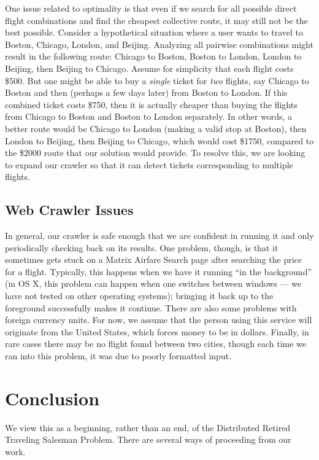 \documentclass{article}
\begin{document}
One issue related to optimality is that even if we search for all possible direct flight combinations and find the cheapest collective route, it may
still not be the best possible. Consider a hypothetical situation where a user wants to travel to Boston, Chicago, London, and Beijing.  Analyzing all
pairwise combinations might result in the following route: Chicago to Boston, Boston to London, London to Beijing, then Beijing to Chicago.  Assume
for simplicity that each flight costs \$500. But one might be able to buy a \emph{single} ticket for \emph{two} flights, say Chicago to Boston and
then (perhaps a few days later) from Boston to London. If this combined ticket costs \$750, then it is actually cheaper than buying the flights from
Chicago to Boston and Boston to London separately. In other words, a better route would be Chicago to London (making a valid stop at Boston), then
London to Beijing, then Beijing to Chicago, which would cost \$1750, compared to the \$2000 route that our solution would provide. To resolve this, we
are looking to expand our crawler so that it can detect tickets corresponding to multiple flights.

\subsection{Web Crawler Issues}

In general, our crawler is safe enough that we are confident in running it and only periodically checking back on its results. One problem, though, is
that it sometimes gets stuck on a Matrix Airfare Search page after searching the price for a flight. Typically, this happens when we have it running
``in the background'' (in OS X, this problem can happen when one switches between windows --- we have not tested on other operating systems); bringing
it back up to the foreground successfully makes it continue. There are also some problems with foreign currency units.  For now, we assume that the
person using this service will originate from the United States, which forces money to be in dollars. Finally, in rare cases there may be no flight
found between two cities, though each time we ran into this problem, it was due to poorly formatted input.


\section{Conclusion}\label{sec:conclusion}

We view this as a beginning, rather than an end, of the Distributed Retired Traveling Salesman Problem. There are several ways of proceeding from our
work.
\end{document}
